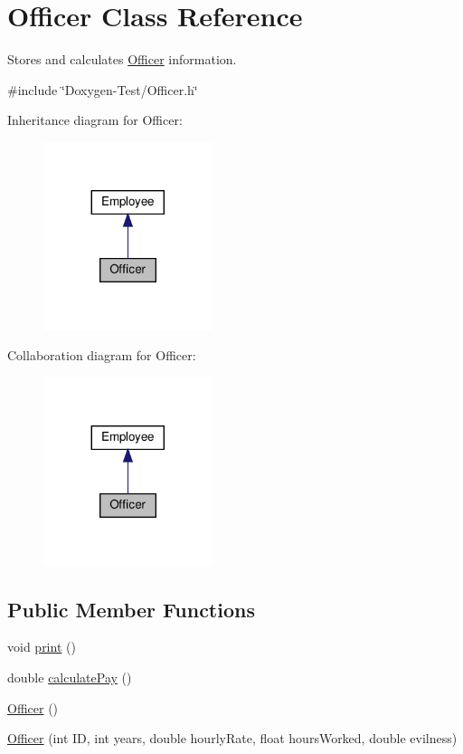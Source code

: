 \hypertarget{classOfficer}{}\section{Officer Class Reference}
\label{classOfficer}


Stores and calculates \hyperlink{classOfficer}{Officer} information.  




{\ttfamily \#include \char`\"{}Doxygen-\/\+Test/\+Officer.\+h\char`\"{}}



Inheritance diagram for Officer\+:
\nopagebreak
\begin{figure}[H]
\begin{center}
\leavevmode
\includegraphics[width=140pt]{classOfficer__inherit__graph}
\end{center}
\end{figure}


Collaboration diagram for Officer\+:
\nopagebreak
\begin{figure}[H]
\begin{center}
\leavevmode
\includegraphics[width=140pt]{classOfficer__coll__graph}
\end{center}
\end{figure}
\subsection*{Public Member Functions}
\begin{DoxyCompactItemize}
\item 
void \hyperlink{classOfficer_aeadece05a1a0b7fb29bd412830d2e07a}{print} ()
\item 
double \hyperlink{classOfficer_a1fa1aad39b9e95be7a088990ebf17059}{calculate\+Pay} ()
\item 
\hyperlink{classOfficer_a80ac1e36a3f36c3a7e12b5dc9320ad89}{Officer} ()
\item 
\hyperlink{classOfficer_ac75c45d6e8628606278cb4ce6596f67f}{Officer} (int ID, int years, double hourly\+Rate, float hours\+Worked, double evilness)
\end{DoxyCompactItemize}
